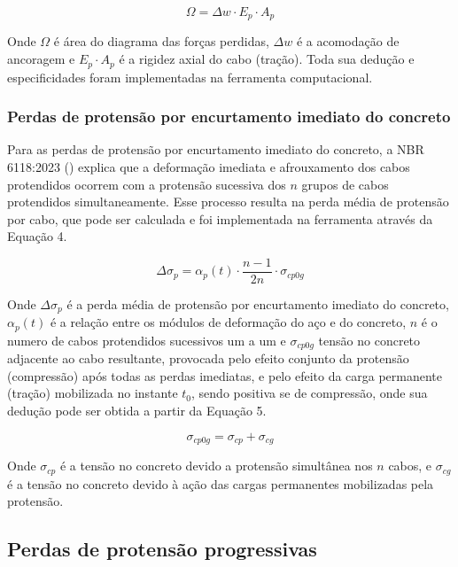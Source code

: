 \begin{equation}
\Omega = \Delta w \cdot E_p \cdot A_p 
\end{equation}\bigskip

Onde $\Omega$ é área do diagrama das forças perdidas, $\Delta w$ é a acomodação de ancoragem e $E_p \cdot A_p$ é a rigidez axial do cabo (tração). Toda sua dedução e especificidades foram implementadas na ferramenta computacional.

\subsubsection{Perdas de protensão por encurtamento imediato do concreto}

\hspace{0.4cm}Para as perdas de protensão por encurtamento imediato do concreto, a NBR 6118:2023 (\citeyear{NOAB}) explica que a deformação imediata e afrouxamento dos cabos protendidos ocorrem com a protensão sucessiva dos $n$ grupos de cabos protendidos simultaneamente. Esse processo resulta na perda média de protensão por cabo, que pode ser calculada e foi implementada na ferramenta através da Equação 4.\bigskip

\begin{equation}
\Delta \sigma_p = \alpha_p (t) \cdot \frac{n - 1}{2n} \cdot \sigma_{cp0g}
\end{equation}\bigskip

Onde $\Delta \sigma_p$ é a perda média de protensão por encurtamento imediato do concreto, $\alpha_p (t)$ é a relação entre os módulos de deformação do aço e do concreto, $n$ é o numero de cabos protendidos sucessivos um a um e $\sigma_{cp0g}$ tensão no concreto adjacente ao cabo resultante, provocada pelo efeito conjunto da protensão (compressão) após todas as perdas imediatas, e pelo efeito da carga permanente (tração) mobilizada no instante $t_0$, sendo positiva se de compressão, onde sua dedução pode ser obtida a partir da Equação 5.\bigskip

\begin{equation}
\sigma_{cp0g} = \sigma_{cp} + \sigma_{cg}
\end{equation}\bigskip

Onde $\sigma_{cp}$ é a tensão no concreto devido a protensão simultânea nos $n$ cabos, e $\sigma_{cg}$ é a tensão no concreto devido à ação das cargas permanentes mobilizadas pela protensão.  

\subsection{Perdas de protensão progressivas}

